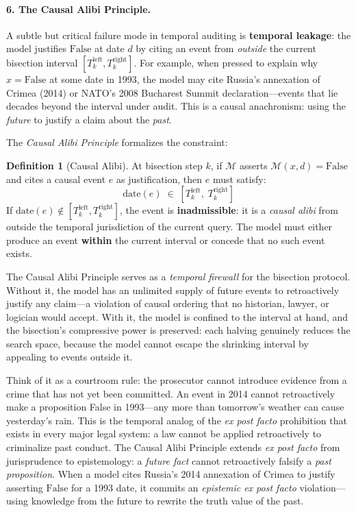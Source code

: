 \documentclass[11pt,a4paper]{article}
\theoremstyle{definition}
\newtheorem{definition}{Definition}[section]
\theoremstyle{plain}
\theoremstyle{remark}
\begin{document}
\paragraph{6. The Causal Alibi Principle.}\label{par:causal-alibi}
A subtle but critical failure mode in temporal auditing is \textbf{temporal leakage}: the model justifies $\mathrm{False}$ at date $d$ by citing an event from \emph{outside} the current bisection interval $[T_k^{\mathrm{left}}, T_k^{\mathrm{right}}]$. For example, when pressed to explain why $x = \mathrm{False}$ at some date in 1993, the model may cite Russia's annexation of Crimea (2014) or NATO's 2008 Bucharest Summit declaration---events that lie decades beyond the interval under audit. This is a causal anachronism: using the \emph{future} to justify a claim about the \emph{past}.

The \textit{Causal Alibi Principle} formalizes the constraint:

\begin{definition}[Causal Alibi]\label{def:causal-alibi}
At bisection step $k$, if $\mathcal{M}$ asserts $\mathcal{M}(x, d) = \mathrm{False}$ and cites a causal event $e$ as justification, then $e$ must satisfy:
\begin{equation}\label{eq:causal-alibi}
  \mathrm{date}(e) \;\in\; [T_k^{\mathrm{left}},\; T_k^{\mathrm{right}}]
\end{equation}
If $\mathrm{date}(e) \notin [T_k^{\mathrm{left}}, T_k^{\mathrm{right}}]$, the event is \textbf{inadmissible}: it is a \emph{causal alibi} from outside the temporal jurisdiction of the current query. The model must either produce an event \textbf{within} the current interval or concede that no such event exists.
\end{definition}

The Causal Alibi Principle serves as a \emph{temporal firewall} for the bisection protocol. Without it, the model has an unlimited supply of future events to retroactively justify any claim---a violation of causal ordering that no historian, lawyer, or logician would accept. With it, the model is confined to the interval at hand, and the bisection's compressive power is preserved: each halving genuinely reduces the search space, because the model cannot escape the shrinking interval by appealing to events outside it.

Think of it as a courtroom rule: the prosecutor cannot introduce evidence from a crime that has not yet been committed. An event in 2014 cannot retroactively make a proposition False in 1993---any more than tomorrow's weather can cause yesterday's rain. This is the temporal analog of the \textit{ex post facto} prohibition that exists in every major legal system: a law cannot be applied retroactively to criminalize past conduct. The Causal Alibi Principle extends \textit{ex post facto} from jurisprudence to epistemology: a \emph{future fact} cannot retroactively falsify a \emph{past proposition}. When a model cites Russia's 2014 annexation of Crimea to justify asserting $\mathrm{False}$ for a 1993 date, it commits an \textit{epistemic ex post facto} violation---using knowledge from the future to rewrite the truth value of the past.
\end{document}
